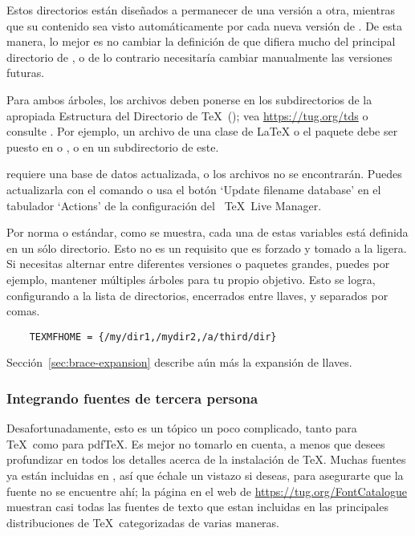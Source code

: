 \documentclass{article}
\begin{document}
Estos directorios están diseñados a permanecer de una versión a otra,
mientras que su contenido sea visto automáticamente por cada nueva
versión de \TL{}. De esta manera, lo mejor es no cambiar la definición
de  que difiera mucho del principal directorio de
\TL{}, o de lo contrario necesitaría cambiar manualmente las versiones
futuras. 


Para ambos árboles, los archivos deben ponerse en los subdirectorios
de la apropiada Estructura del Directorio de \TeX\ (\TDS); vea
\url{https://tug.org/tds} o consulte
. Por ejemplo, un archivo de una
clase de \LaTeX{}
o 
el paquete debe ser puesto en  o
, o en un subdirectorio de este.

 requiere una base de datos actualizada, o los
archivos no se encontrarán. Puedes actualizarla con el comando
 o usa el botón `Update filename database' en el
tabulador `Actions' de la configuración del \GUI\ \TeX\ Live Manager. 

Por norma o estándar, como se muestra, cada una de estas variables está
definida en un sólo directorio. Esto no es
un requisito que es forzado y tomado a la ligera. Si necesitas alternar entre
diferentes versiones o paquetes grandes, puedes por ejemplo, 
mantener múltiples árboles para tu propio
objetivo. Esto se logra, configurando  a la lista de directorios, 
encerrados entre llaves, y separados por comas.

\begin{verbatim}
	TEXMFHOME = {/my/dir1,/mydir2,/a/third/dir}
\end{verbatim}

Sección~\ref{sec:brace-expansion} describe aún más la expansión de llaves. 

\subsubsection{Integrando fuentes de tercera persona}

Desafortunadamente, esto es un tópico un poco complicado, tanto para \TeX\ como para pdf\TeX{}. Es mejor no
tomarlo en cuenta, a menos que desees profundizar en todos los
detalles acerca de la instalación de \TeX{}. Muchas fuentes ya están
incluidas en \TL, así que échale un vistazo si deseas, para asegurarte que la fuente no se encuentre ahí; la página en el web de \url{https://tug.org/FontCatalogue} muestran casi todas las fuentes de texto que estan incluidas en las principales distribuciones de \TeX\, categorizadas de varias maneras.
 
\end{document}
